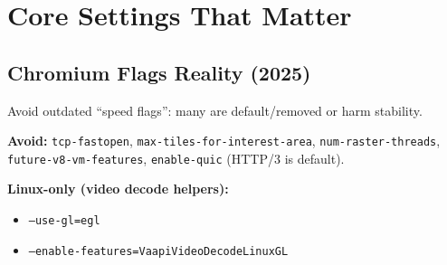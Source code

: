 \documentclass[10pt,a4paper,oneside]{book}
\begin{document}
\chapter{Core Settings That Matter}
\section{Chromium Flags Reality (2025)}
\begin{warningbox}
Avoid outdated “speed flags”: many are default/removed or harm stability.
\end{warningbox}
\textbf{Avoid:} \texttt{tcp-fastopen}, \texttt{max-tiles-for-interest-area}, \texttt{num-raster-threads}, \texttt{future-v8-vm-features}, \texttt{enable-quic} (HTTP/3 is default).

\textbf{Linux-only (video decode helpers):}
\begin{itemize}
  \item \texttt{--use-gl=egl}
  \item \texttt{--enable-features=VaapiVideoDecodeLinuxGL}
\end{itemize}
\end{document}
